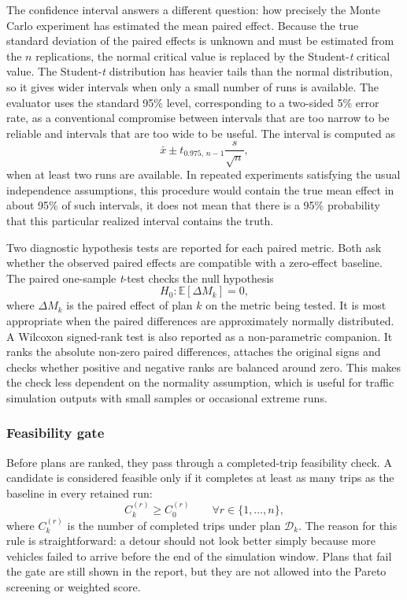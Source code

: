 The confidence interval answers a different question: how precisely the
Monte Carlo experiment has estimated the mean paired effect. Because the true
standard deviation of the paired effects is unknown and must be estimated
from the $n$ replications, the normal critical value is replaced by the
Student-\textit{t} critical value. The Student-\textit{t} distribution has
heavier tails than the normal distribution, so it gives wider intervals when
only a small number of runs is available. The evaluator uses the standard
95\% level, corresponding to a two-sided 5\% error rate, as a conventional
compromise between intervals that are too narrow to be reliable and intervals
that are too wide to be useful. The interval is computed as
\begin{equation}
  \bar{x}
  \pm
  t_{0.975,\,n-1}\frac{s}{\sqrt{n}},
  \label{eq:evaluator_t_interval}
\end{equation}
when at least two runs are available. In repeated experiments satisfying the
usual independence assumptions, this procedure would contain the true mean
effect in about 95\% of such intervals, it does not mean that there is a
95\% probability that this particular realized interval contains the truth.

Two diagnostic hypothesis tests are reported for each paired metric. Both ask
whether the observed paired effects are compatible with a zero-effect
baseline. The paired one-sample \textit{t}-test checks the null hypothesis
\begin{equation}
  H_0: \mathbb{E}[\Delta M_k] = 0,
\end{equation}
where $\Delta M_k$ is the paired effect of plan $k$ on the metric being
tested. It is most appropriate when the paired differences are approximately
normally distributed. A Wilcoxon signed-rank test is also reported as a
non-parametric companion. It ranks the absolute non-zero paired differences,
attaches the original signs and checks whether positive and negative ranks are
balanced around zero. This makes the check less dependent on the normality
assumption, which is useful for traffic simulation outputs with small samples
or occasional extreme runs.

\subsubsection{Feasibility gate}
\label{sssec:evaluator_feasibility}

Before plans are ranked, they pass through a completed-trip feasibility check.
A candidate is considered feasible only if it completes at least as many trips
as the baseline in every retained run:
\begin{equation}
  C_k^{(r)} \geq C_0^{(r)}
  \qquad
  \forall r \in \{1,\ldots,n\},
  \label{eq:evaluator_feasibility}
\end{equation}
where $C_k^{(r)}$ is the number of completed trips under plan
$\mathcal{D}_k$. The reason for this rule is straightforward: a detour should
not look better simply because more vehicles failed to arrive before the end
of the simulation window. Plans that fail the gate are still shown in the
report, but they are not allowed into the Pareto screening or weighted score.

